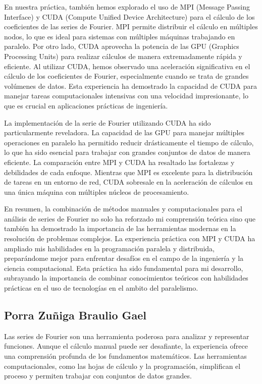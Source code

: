 En nuestra práctica, también hemos explorado el uso de MPI (Message Passing Interface) y CUDA (Compute Unified Device Architecture) para el cálculo de los coeficientes de las series de Fourier. MPI permite distribuir el cálculo en múltiples nodos, lo que es ideal para sistemas con múltiples máquinas trabajando en paralelo. Por otro lado, CUDA aprovecha la potencia de las GPU (Graphics Processing Units) para realizar cálculos de manera extremadamente rápida y eficiente. Al utilizar CUDA, hemos observado una aceleración significativa en el cálculo de los coeficientes de Fourier, especialmente cuando se trata de grandes volúmenes de datos. Esta experiencia ha demostrado la capacidad de CUDA para manejar tareas computacionales intensivas con una velocidad impresionante, lo que es crucial en aplicaciones prácticas de ingeniería.

La implementación de la serie de Fourier utilizando CUDA ha sido particularmente reveladora. La capacidad de las GPU para manejar múltiples operaciones en paralelo ha permitido reducir drásticamente el tiempo de cálculo, lo que ha sido esencial para trabajar con grandes conjuntos de datos de manera eficiente. La comparación entre MPI y CUDA ha resaltado las fortalezas y debilidades de cada enfoque. Mientras que MPI es excelente para la distribución de tareas en un entorno de red, CUDA sobresale en la aceleración de cálculos en una única máquina con múltiples núcleos de procesamiento.

En resumen, la combinación de métodos manuales y computacionales para el análisis de series de Fourier no solo ha reforzado mi comprensión teórica sino que también ha demostrado la importancia de las herramientas modernas en la resolución de problemas complejos. La experiencia práctica con MPI y CUDA ha ampliado mis habilidades en la programación paralela y distribuida, preparándome mejor para enfrentar desafíos en el campo de la ingeniería y la ciencia computacional. Esta práctica ha sido fundamental para mi desarrollo, subrayando la importancia de combinar conocimientos teóricos con habilidades prácticas en el uso de tecnologías en el ambito del paralelismo.

\subsection{Porra Zuñiga Braulio Gael}

Las series de Fourier son una herramienta poderosa para analizar y representar funciones. Aunque el cálculo manual puede ser desafiante, la experiencia ofrece una comprensión profunda de los fundamentos matemáticos. Las herramientas computacionales, como las hojas de cálculo y la programación, simplifican el proceso y permiten trabajar con conjuntos de datos grandes.

